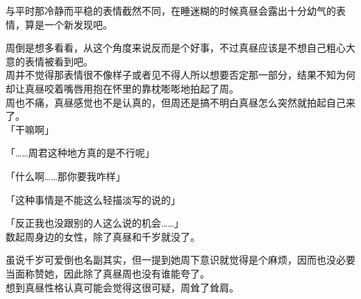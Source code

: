与平时那冷静而平稳的表情截然不同，在睡迷糊的时候真昼会露出十分幼气的表情，算是一个新发现吧。

周倒是想多看看，从这个角度来说反而是个好事，不过真昼应该是不想自己粗心大意的表情被看到吧。\\

周并不觉得那表情很不像样子或者见不得人所以想要否定那一部分，结果不知为何却让真昼咬着嘴唇用抱在怀里的靠枕嘭嘭地拍起了周。\\

周也不痛，真昼感觉也不是认真的，但周还是搞不明白真昼怎么突然就拍起自己来了。\\

「干嘛啊」

「……周君这种地方真的是不行呢」

「什么啊……那你要我咋样」

「这种事情是不能这么轻描淡写的说的」

「反正我也没跟别的人这么说的机会……」\\

数起周身边的女性，除了真昼和千岁就没了。

虽说千岁可爱倒也名副其实，但一提到她周下意识就觉得是个麻烦，因而也没必要当面称赞她，因此除了真昼周也没有谁能夸了。\\

想到真昼性格认真可能会觉得这很可疑，周耸了耸肩。\\

